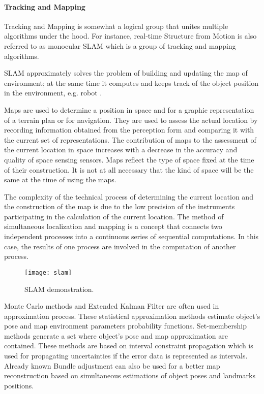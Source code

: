 \documentclass[../../../../main]{subfiles}
\begin{document}
\paragraph{Tracking and Mapping}

Tracking and Mapping is somewhat a logical group that unites multiple algorithms under the hood. For instance, real-time Structure from Motion is also referred to as monocular \ac{SLAM} which is a group of tracking and mapping algorithms.

\ac{SLAM} approximately solves the problem of building and updating the map of environment; at the same time it computes and keeps track of the object position in the environment, e.g. robot \cite{springer_handbook_of_robotics}. 

Maps are used to determine a position in space and for a graphic representation of a terrain plan or for navigation. They are used to assess the actual location by recording information obtained from the perception form and comparing it with the current set of representations. The contribution of maps to the assessment of the current location in space increases with a decrease in the accuracy and quality of space sensing sensors. Maps reflect the type of space fixed at the time of their construction. It is not at all necessary that the kind of space will be the same at the time of using the maps.

The complexity of the technical process of determining the current location and the construction of the map is due to the low precision of the instruments participating in the calculation of the current location. The method of simultaneous localization and mapping is a concept that connects two independent processes into a continuous series of sequential computations. In this case, the results of one process are involved in the computation of another process.

\begin{figure} [ht!]
    \begin{center}
        \texttt{[image: slam]}
        \caption{SLAM demonstration.}
        \label{fig:slam}
    \end{center}
\end{figure}

Monte Carlo methods and Extended Kalman Filter are often used in approximation process. These statistical approximation methods estimate object's pose and map environment parameters probability functions. Set-membership methods generate a set where object's pose and map approximation are contained. These methods are based on interval constraint propagation which is used for propagating uncertainties if the error data is represented as intervals. Already known Bundle adjustment can also be used for a better map reconstruction based on simultaneous estimations of object poses and landmarks positions.
\end{document}

